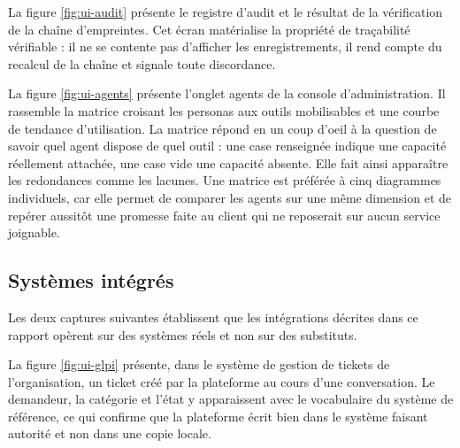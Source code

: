 La figure \ref{fig:ui-audit} présente le registre d'audit et le résultat de la vérification de la chaîne d'empreintes. Cet écran matérialise la propriété de traçabilité vérifiable : il ne se contente pas d'afficher les enregistrements, il rend compte du recalcul de la chaîne et signale toute discordance.


La figure \ref{fig:ui-agents} présente l'onglet agents de la console d'administration. Il rassemble la matrice croisant les personas aux outils mobilisables et une courbe de tendance d'utilisation. La matrice répond en un coup d'oeil à la question de savoir quel agent dispose de quel outil : une case renseignée indique une capacité réellement attachée, une case vide une capacité absente. Elle fait ainsi apparaître les redondances comme les lacunes. Une matrice est préférée à cinq diagrammes individuels, car elle permet de comparer les agents sur une même dimension et de repérer aussitôt une promesse faite au client qui ne reposerait sur aucun service joignable.


\subsection{Systèmes intégrés}

Les deux captures suivantes établissent que les intégrations décrites dans ce rapport opèrent sur des systèmes réels et non sur des substituts.

La figure \ref{fig:ui-glpi} présente, dans le système de gestion de tickets de l'organisation, un ticket créé par la plateforme au cours d'une conversation. Le demandeur, la catégorie et l'état y apparaissent avec le vocabulaire du système de référence, ce qui confirme que la plateforme écrit bien dans le système faisant autorité et non dans une copie locale.


